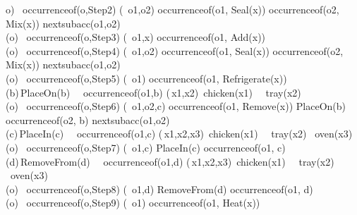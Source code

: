 \begin{center}
\forall o) \ occurrence\textunderscore of(o,Step2) \supset (\exists\, o1,o2) \land occurrence\textunderscore of(o1, Seal(x)) \land occurrence\textunderscore of(o2, Mix(x)) \land  next\textunderscore subacc(o1,o2) \\

(\forall o) \ occurrence\textunderscore of(o,Step3) \supset (\exists\, o1,x) \land occurrence\textunderscore of(o1, Add(x)) \\

(\forall o) \ occurrence\textunderscore of(o,Step4) \supset (\exists\, o1,o2) \land occurrence\textunderscore of(o1, Seal(x)) \land occurrence\textunderscore of(o2, Mix(x)) \land  next\textunderscore subacc(o1,o2) \\

(\forall o) \ occurrence\textunderscore of(o,Step5) \supset (\exists\, o1) \land occurrence\textunderscore of(o1, Refrigerate(x)) \\

(\forall b)\,PlaceOn(b) \  \land \  occurrence\textunderscore of(o1,b) \supset (\exists\,x1,x2)\  \land chicken(x1) \ \land \  tray(x2) \\

(\forall o) \ occurrence\textunderscore of(o,Step6) \supset (\exists\, o1,o2,c) \land occurrence\textunderscore of(o1, Remove(x)) \land PlaceOn(b) \land occurrence\textunderscore of(o2, b) \land  next\textunderscore subacc(o1,o2) \\

(\forall c)\,PlaceIn(c) \  \land \  occurrence\textunderscore of(o1,c) \supset (\exists\,x1,x2,x3)\  \land chicken(x1) \ \land \  tray(x2) \land \ oven(x3) \\

(\forall o) \ occurrence\textunderscore of(o,Step7) \supset (\exists\, o1,c)  \land PlaceIn(c) \land occurrence\textunderscore of(o1, c) \\

(\forall d)\,RemoveFrom(d) \  \land \  occurrence\textunderscore of(o1,d) \supset (\exists\,x1,x2,x3)\  \land chicken(x1) \ \land \  tray(x2) \land \ oven(x3) \\

(\forall o) \ occurrence\textunderscore of(o,Step8) \supset (\exists\, o1,d)  \land RemoveFrom(d) \land occurrence\textunderscore of(o1, d) \\

(\forall o) \ occurrence\textunderscore of(o,Step9) \supset (\exists\, o1) \land occurrence\textunderscore of(o1, Heat(x)) \\


\end{center}
